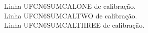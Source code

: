 \documentclass{abntexto-ufc}
\begin{document}
\pretextual


\thispagestyle{empty}
\begingroup
\onehalfsp
Linha UFCN6SUMCALONE de calibração.\\
Linha UFCN6SUMCALTWO de calibração.\\
Linha UFCN6SUMCALTHREE de calibração.
\par
\endgroup
\end{document}
